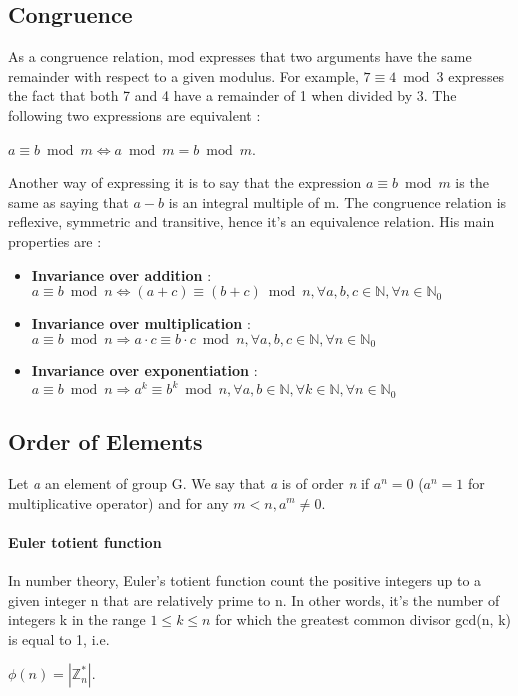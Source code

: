 \documentclass[11pt]{article}
\begin{document}
\subsection{Congruence}
As a congruence relation, mod expresses that two arguments have the same remainder with respect to a given modulus. For example, $7 \equiv 4 \bmod 3$ expresses the fact that both 7 and 4 have a remainder of 1 when divided by 3. The following two expressions are equivalent :
\begin{center}
$a \equiv b \bmod m \Leftrightarrow a \bmod m = b \bmod m$.
\end{center}
Another way of expressing it is to say that the expression $a \equiv b \bmod m$ is the same as saying that $a - b$ is an integral multiple of m. The congruence relation is reflexive, symmetric and transitive, hence it's an equivalence relation. His main properties are : 
\begin{itemize}
\item \textbf{Invariance over addition} : $a \equiv b \bmod n \Leftrightarrow (a + c) \equiv (b + c) \bmod n, \forall a,b,c \in \mathbb{N}, \forall n \in \mathbb{N}_0$
\item \textbf{Invariance over multiplication} : $a \equiv b \bmod n \Rightarrow a \cdot c \equiv b \cdot c \bmod n, \forall a,b,c \in \mathbb{N}, \forall n \in \mathbb{N}_0$
\item \textbf{Invariance over exponentiation} : $a \equiv b \bmod n \Rightarrow a^k \equiv b^k \bmod n, \forall a,b \in \mathbb{N}, \forall k \in \mathbb{N}, \forall n \in \mathbb{N}_0$
\end{itemize}
\subsection{Order of Elements}
Let \textit{a} an element of group G. We say that \textit{a} is of order \textit{n} if $a^n = 0$ ($a^n = 1$ for multiplicative operator) and for any $m < n, a^m \neq 0$.
\paragraph{Euler totient function} In number theory, Euler's totient function count the positive integers up to a given integer n that are relatively prime to n. In other words, it's the number of integers k in the range $1 \leq k \leq n$ for which the greatest common divisor gcd(n, k) is equal to 1, i.e.
\begin{center}
$\phi(n) = |\mathbb{Z}_n^*|$.
\end{center}
\end{document}
